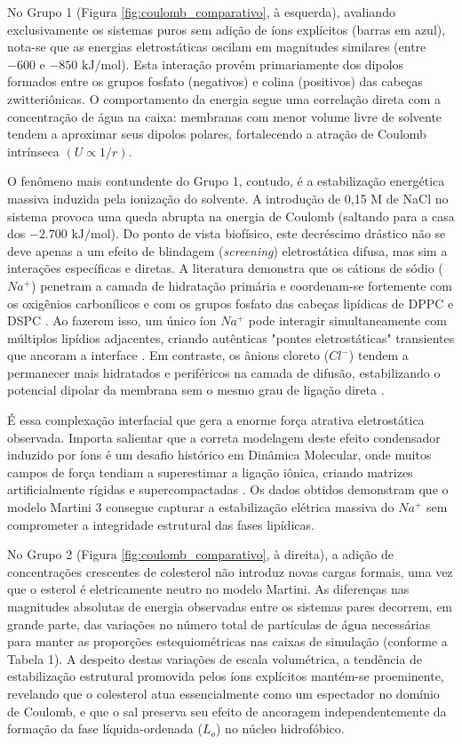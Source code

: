 \documentclass[12pt]{article} %
\begin{document}
No Grupo 1 (Figura \ref{fig:coulomb_comparativo}, à esquerda), avaliando exclusivamente os sistemas puros sem adição de íons explícitos (barras em azul), nota-se que as energias eletrostáticas oscilam em magnitudes similares (entre $-600$ e $-850\text{ kJ/mol}$). Esta interação provém primariamente dos dipolos formados entre os grupos fosfato (negativos) e colina (positivos) das cabeças zwitteriônicas. O comportamento da energia segue uma correlação direta com a concentração de água na caixa: membranas com menor volume livre de solvente tendem a aproximar seus dipolos polares, fortalecendo a atração de Coulomb intrínseca $(U \propto 1/r)$.

O fenômeno mais contundente do Grupo 1, contudo, é a estabilização energética massiva induzida pela ionização do solvente. A introdução de 0,15 M de NaCl no sistema provoca uma queda abrupta na energia de Coulomb (saltando para a casa dos $-2.700\text{ kJ/mol}$). Do ponto de vista biofísico, este decréscimo drástico não se deve apenas a um efeito de blindagem (\textit{screening}) eletrostática difusa, mas sim a interações específicas e diretas. A literatura demonstra que os cátions de sódio ($Na^+$) penetram a camada de hidratação primária e coordenam-se fortemente com os oxigênios carbonílicos e com os grupos fosfato das cabeças lipídicas de DPPC e DSPC \cite{bockmann2003, javanainen2017}. Ao fazerem isso, um único íon $Na^+$ pode interagir simultaneamente com múltiplos lipídios adjacentes, criando autênticas "pontes eletrostáticas" transientes que ancoram a interface \cite{bockmann2003}. Em contraste, os ânions cloreto ($Cl^-$) tendem a permanecer mais hidratados e periféricos na camada de difusão, estabilizando o potencial dipolar da membrana sem o mesmo grau de ligação direta \cite{reif2017}.

É essa complexação interfacial que gera a enorme força atrativa eletrostática observada. Importa salientar que a correta modelagem deste efeito condensador induzido por íons é um desafio histórico em Dinâmica Molecular, onde muitos campos de força tendiam a superestimar a ligação iônica, criando matrizes artificialmente rígidas e supercompactadas \cite{venable2013, melcr2018}. Os dados obtidos demonstram que o modelo Martini 3 consegue capturar a estabilização elétrica massiva do $Na^+$ sem comprometer a integridade estrutural das fases lipídicas.

No Grupo 2 (Figura \ref{fig:coulomb_comparativo}, à direita), a adição de concentrações crescentes de colesterol não introduz novas cargas formais, uma vez que o esterol é eletricamente neutro no modelo Martini. As diferenças nas magnitudes absolutas de energia observadas entre os sistemas pares decorrem, em grande parte, das variações no número total de partículas de água necessárias para manter as proporções estequiométricas nas caixas de simulação (conforme a Tabela 1). A despeito destas variações de escala volumétrica, a tendência de estabilização estrutural promovida pelos íons explícitos mantém-se proeminente, revelando que o colesterol atua essencialmente como um espectador no domínio de Coulomb, e que o sal preserva seu efeito de ancoragem independentemente da formação da fase líquida-ordenada ($L_o$) no núcleo hidrofóbico.
\end{document}
